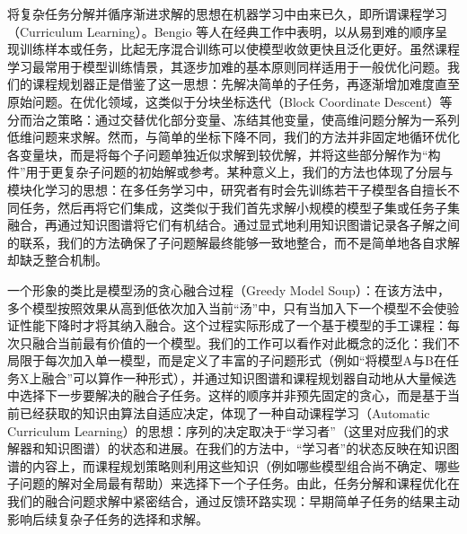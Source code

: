 \documentclass[../main.tex]{subfiles}
\begin{document}
将复杂任务分解并循序渐进求解的思想在机器学习中由来已久，即所谓课程学习（Curriculum Learning）。Bengio 等人在经典工作中表明，以从易到难的顺序呈现训练样本或任务，比起无序混合训练可以使模型收敛更快且泛化更好。虽然课程学习最常用于模型训练情景，其逐步加难的基本原则同样适用于一般优化问题。我们的课程规划器正是借鉴了这一思想：先解决简单的子任务，再逐渐增加难度直至原始问题。在优化领域，这类似于分块坐标迭代（Block Coordinate Descent）等分而治之策略：通过交替优化部分变量、冻结其他变量，使高维问题分解为一系列低维问题来求解。然而，与简单的坐标下降不同，我们的方法并非固定地循环优化各变量块，而是将每个子问题单独近似求解到较优解，并将这些部分解作为“构件”用于更复杂子问题的初始解或参考。某种意义上，我们的方法也体现了分层与模块化学习的思想：在多任务学习中，研究者有时会先训练若干子模型各自擅长不同任务，然后再将它们集成，这类似于我们首先求解小规模的模型子集或任务子集融合，再通过知识图谱将它们有机结合。通过显式地利用知识图谱记录各子解之间的联系，我们的方法确保了子问题解最终能够一致地整合，而不是简单地各自求解却缺乏整合机制。

一个形象的类比是模型汤的贪心融合过程（Greedy Model Soup）：在该方法中，多个模型按照效果从高到低依次加入当前“汤”中，只有当加入下一个模型不会使验证性能下降时才将其纳入融合。这个过程实际形成了一个基于模型的手工课程：每次只融合当前最有价值的一个模型。我们的工作可以看作对此概念的泛化：我们不局限于每次加入单一模型，而是定义了丰富的子问题形式（例如“将模型A与B在任务X上融合”可以算作一种形式），并通过知识图谱和课程规划器自动地从大量候选中选择下一步要解决的融合子任务。这样的顺序并非预先固定的贪心，而是基于当前已经获取的知识由算法自适应决定，体现了一种自动课程学习（Automatic Curriculum Learning）的思想：序列的决定取决于“学习者”（这里对应我们的求解器和知识图谱）的状态和进展。在我们的方法中，“学习者”的状态反映在知识图谱的内容上，而课程规划策略则利用这些知识（例如哪些模型组合尚不确定、哪些子问题的解对全局最有帮助）来选择下一个子任务。由此，任务分解和课程优化在我们的融合问题求解中紧密结合，通过反馈环路实现：早期简单子任务的结果主动影响后续复杂子任务的选择和求解。
\end{document}
